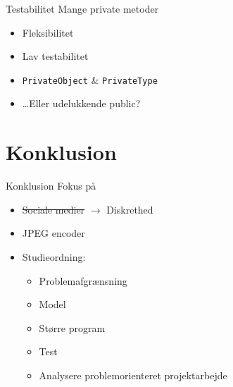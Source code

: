 \begin{frame}[fragile]{Testabilitet}
    Mange private metoder
    \begin{itemize}
        \item Fleksibilitet %
        \item Lav testabilitet
    \end{itemize}
    \begin{itemize}
        \item<1-> \lstinline|PrivateObject| \& \lstinline|PrivateType|
        \item<2-> \ldots Eller udelukkende public?
    \end{itemize}
\end{frame}

\section{Konklusion}
\begin{frame}{Konklusion}
    Fokus på
    \begin{itemize}
        \item{\sout{Sociale medier} $\rightarrow$ Diskrethed}
        \item JPEG encoder
        \item Studieordning:
        \begin{itemize}
            \item<2->[\textcolor{green}{\checkmark}] Problemafgrænsning
            \item<3->[\textcolor{green}{\checkmark}] Model
            \item<4->[\textcolor{green}{\checkmark}] Større program
            \item<5->[\textcolor{green}{\checkmark}] Test
            \item<6->[\textcolor{green}{\checkmark}] Analysere problemorienteret projektarbejde
            \end{itemize}
    \end{itemize}
\end{frame}
